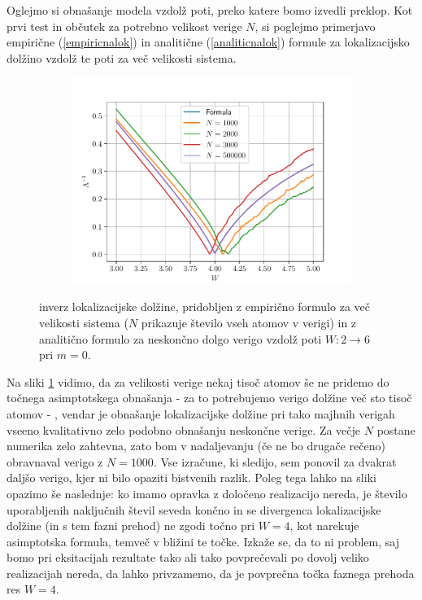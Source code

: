 Oglejmo si obnašanje modela vzdolž poti, preko katere bomo izvedli preklop. 
Kot prvi test in občutek za potrebno velikost verige $N$, si poglejmo primerjavo empirične (\ref{empiricnalok}) in analitične (\ref{analiticnalok}) formule za lokalizacijsko dolžino vzdolž te poti za več velikosti sistema.
\begin{figure}[H]
\centering
\begin{subfigure}{\textwidth}
\includegraphics[width=\linewidth]{Figures/locLength.pdf}
\end{subfigure}
\caption{inverz lokalizacijske dolžine, pridobljen z empirično formulo za več velikosti sistema ($N$ prikazuje število vseh atomov v verigi) in z analitično formulo za neskončno dolgo verigo vzdolž poti $W: 2 \to 6$ pri $m=0$.}
\label{fig:locLength}
\end{figure}
Na sliki \ref{fig:locLength} vidimo, da za velikosti verige nekaj tisoč atomov še ne pridemo do točnega asimptotskega obnašanja - za to potrebujemo verigo dolžine več sto tisoč atomov - , vendar je obnašanje lokalizacijske dolžine pri tako majhnih verigah vseeno kvalitativno zelo podobno obnašanju neskončne verige. Za večje $N$ postane numerika zelo zahtevna, zato bom v nadaljevanju (če ne bo drugače rečeno) obravnaval verigo z $N=1000$. Vse izračune, ki sledijo, sem ponovil za dvakrat daljšo verigo, kjer ni bilo opaziti bistvenih razlik. Poleg tega lahko na sliki opazimo še naslednje: ko imamo opravka z določeno realizacijo nereda, je število uporabljenih naključnih števil seveda končno in se divergenca lokalizacijske dolžine (in s tem fazni prehod) ne zgodi točno pri $W=4$, kot narekuje asimptotska formula, temveč v bližini te točke. Izkaže se, da to ni problem, saj bomo pri eksitacijah rezultate tako ali tako povprečevali po dovolj veliko realizacijah nereda, da lahko privzamemo, da je povprečna točka faznega prehoda res $W=4$.

